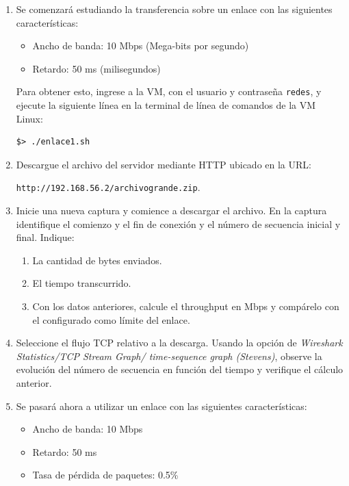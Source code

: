 \documentclass[a4paper,10pt]{article}
\begin{document}
\begin{enumerate}

    \item Se comenzará estudiando la transferencia sobre un enlace con las siguientes características:
    \begin{itemize}
        \item Ancho de banda: 10 Mbps (Mega-bits por segundo)
        \item Retardo: 50 ms (milisegundos)
    \end{itemize}
    Para obtener esto, ingrese a la VM, con el usuario y contraseña \texttt{redes}, y ejecute la siguiente línea en la terminal de línea de comandos de la VM Linux:
    \begin{verbatim}
$> ./enlace1.sh
    \end{verbatim}

    \item Descargue el archivo del servidor mediante HTTP ubicado en la URL:
    
    \texttt{http://192.168.56.2/archivogrande.zip}.
    
    \item Inicie una nueva captura y comience a descargar el archivo. En la captura identifique el comienzo y el fin de conexión y el número de secuencia inicial y final. Indique:
    \begin{enumerate}
        \item La cantidad de bytes enviados.
        \item El tiempo transcurrido.
        \item Con los datos anteriores, calcule el throughput en Mbps y compárelo con el configurado como límite del enlace.
    \end{enumerate}

    \item Seleccione el flujo TCP relativo a la descarga. Usando la opción de \emph{Wireshark Statistics/TCP Stream Graph/ time-sequence graph (Stevens)}, observe la evolución del número de secuencia en función del tiempo y verifique el cálculo anterior.
    
    \item Se pasará ahora a utilizar un enlace con las siguientes características:
        \begin{itemize}
        \item Ancho de banda: 10 Mbps
        \item Retardo: 50 ms
        \item Tasa de pérdida de paquetes: 0.5\%
        \end{itemize}


\end{enumerate}
\end{document}
